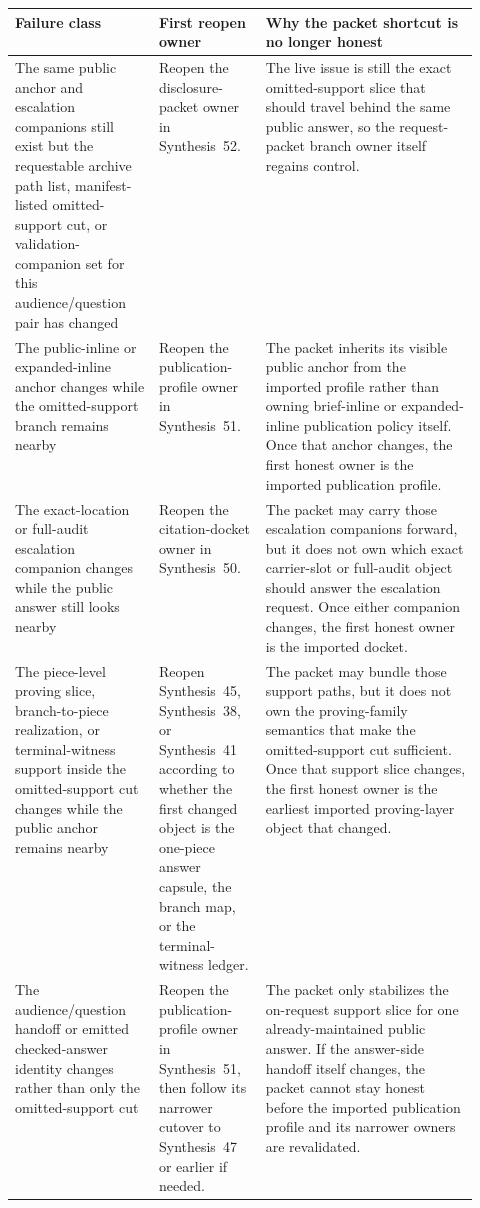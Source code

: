 \documentclass[11pt]{article}
\begin{document}
\begin{table}[t]
\centering
\small
\begin{tabularx}{\linewidth}{@{}p{0.31\linewidth}p{0.23\linewidth}X@{}}
\toprule
Failure class & First reopen owner & Why the packet shortcut is no longer honest \\
\midrule
The same public anchor and escalation companions still exist but the requestable archive path list, manifest-listed omitted-support cut, or validation-companion set for this audience/question pair has changed & Reopen the disclosure-packet owner in Synthesis~52. & The live issue is still the exact omitted-support slice that should travel behind the same public answer, so the request-packet branch owner itself regains control. \\
The public-inline or expanded-inline anchor changes while the omitted-support branch remains nearby & Reopen the publication-profile owner in Synthesis~51. & The packet inherits its visible public anchor from the imported profile rather than owning brief-inline or expanded-inline publication policy itself. Once that anchor changes, the first honest owner is the imported publication profile. \\
The exact-location or full-audit escalation companion changes while the public answer still looks nearby & Reopen the citation-docket owner in Synthesis~50. & The packet may carry those escalation companions forward, but it does not own which exact carrier-slot or full-audit object should answer the escalation request. Once either companion changes, the first honest owner is the imported docket. \\
The piece-level proving slice, branch-to-piece realization, or terminal-witness support inside the omitted-support cut changes while the public anchor remains nearby & Reopen Synthesis~45, Synthesis~38, or Synthesis~41 according to whether the first changed object is the one-piece answer capsule, the branch map, or the terminal-witness ledger. & The packet may bundle those support paths, but it does not own the proving-family semantics that make the omitted-support cut sufficient. Once that support slice changes, the first honest owner is the earliest imported proving-layer object that changed. \\
The audience/question handoff or emitted checked-answer identity changes rather than only the omitted-support cut & Reopen the publication-profile owner in Synthesis~51, then follow its narrower cutover to Synthesis~47 or earlier if needed. & The packet only stabilizes the on-request support slice for one already-maintained public answer. If the answer-side handoff itself changes, the packet cannot stay honest before the imported publication profile and its narrower owners are revalidated. \\

\end{tabularx}
\end{table}
\end{document}
